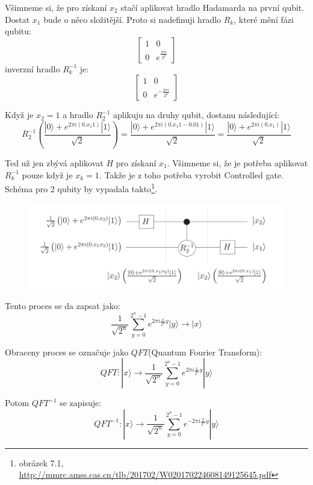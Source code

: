 \documentclass[11pt]{article}
\begin{document}
\par Všimneme si, že pro získaní $x_2$ stačí aplikovat hradlo Hadamarda na první qubit.
Dostat $x_1$ bude o něco složitější.
Proto si nadefinuji hradlo $R_k$, které mění fázi qubitu:
$$
    \begin{bmatrix}
        1 & 0                       \\
        0 & e^{\frac{2 \pi i}{2^k}}
    \end{bmatrix}
$$
inverzní hradlo $R_k^{-1}$ je:
$$
    \begin{bmatrix}
        1 & 0                        \\
        0 & e^{-\frac{2 \pi i}{2^k}}
    \end{bmatrix}
$$
\par Když je $x_2 = 1$ a hradlo $R_2^{-1}$ aplikuju na druhy qubit, dostanu následující:
$$
    R_2^{-1}\left(\frac{|0\rangle + e^{2\pi i (0.x_1 1)}|1\rangle}{\sqrt{2}}\right) =
    \frac{|0\rangle + e^{2\pi i (0.x_1 1 - 0.01)}|1\rangle}{\sqrt{2}} =
    \frac{|0\rangle + e^{2\pi i (0.x_1)}|1\rangle}{\sqrt{2}}
$$
\par Ted už jen zbývá aplikovat $H$ pro získaní $x_1$.
Všimneme si, že je potřeba aplikovat $R_k^{-1}$ pouze když je $x_{k} = 1$.
Takže je z toho potřeba vyrobit Controlled gate.
Schéma pro 2 qubity by vypadala takto\footnote{obrázek 7.1, \url{http://mmrc.amss.cas.cn/tlb/201702/W020170224608149125645.pdf}}.
\begin{figure}[H]
    \includegraphics[scale=.6]{phase_estimation}
    \centering
\end{figure}
\par Tento proces se da zapsat jako:
$$\frac{1}{\sqrt{2^n}}\displaystyle\sum_{y=0}^{2^n - 1} e^{2\pi i \frac{x}{2^n} y}|y\rangle \to |x\rangle$$
\par Obraceny proces se označuje jako $QFT$(Quantum Fourier Transform):
$$QFT:|x\rangle \to \frac{1}{\sqrt{2^n}}\displaystyle\sum_{y=0}^{2^n - 1} e^{2\pi i \frac{x}{2^n} y}|y\rangle$$
\par Potom $QFT^{-1}$ se zapisuje:
$$QFT^{-1}:|x\rangle \to \frac{1}{\sqrt{2^n}}\displaystyle\sum_{y=0}^{2^n - 1} e^{-2\pi i \frac{x}{2^n} y}|y\rangle$$
\end{document}
